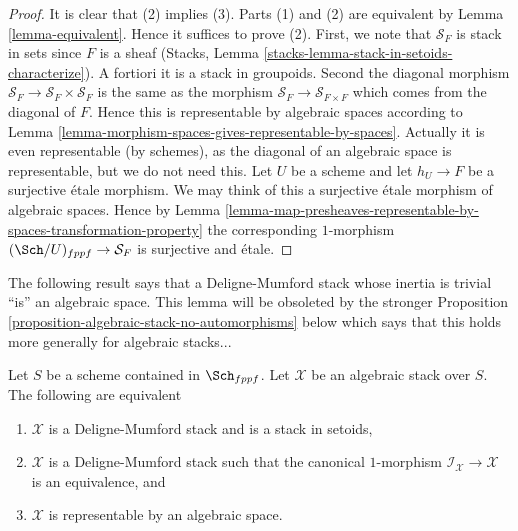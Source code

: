 \begin{proof}
It is clear that (2) implies (3).
Parts (1) and (2) are equivalent by Lemma \ref{lemma-equivalent}.
Hence it suffices to prove (2).
First, we note that $\mathcal{S}_F$ is stack in sets since
$F$ is a sheaf (Stacks, Lemma
\ref{stacks-lemma-stack-in-setoids-characterize}).
A fortiori it is a stack in groupoids. Second the diagonal
morphism $\mathcal{S}_F \to \mathcal{S}_F  \times \mathcal{S}_F$
is the same as the morphism $\mathcal{S}_F \to \mathcal{S}_{F \times F}$
which comes from the diagonal of $F$. Hence this is representable
by algebraic spaces according to
Lemma \ref{lemma-morphism-spaces-gives-representable-by-spaces}.
Actually it is even representable (by schemes), as the diagonal of
an algebraic space is representable, but we do not need this.
Let $U$ be a scheme and let $h_U \to F$ be a surjective \'etale morphism.
We may think of this a surjective \'etale morphism of algebraic spaces.
Hence by
Lemma
\ref{lemma-map-presheaves-representable-by-spaces-transformation-property}
the corresponding $1$-morphism $(\Sch/U)_{fppf} \to \mathcal{S}_F$
is surjective and \'etale.
\end{proof}

\noindent
The following result says that a Deligne-Mumford stack whose inertia
is trivial ``is'' an algebraic space. This lemma will be obsoleted by
the stronger
Proposition \ref{proposition-algebraic-stack-no-automorphisms}
below which says that this holds more generally for algebraic stacks...

\begin{lemma}
\label{lemma-algebraic-stack-no-automorphisms}
Let $S$ be a scheme contained in $\Sch_{fppf}$.
Let $\mathcal{X}$ be an algebraic stack over $S$.
The following are equivalent
\begin{enumerate}
\item $\mathcal{X}$ is a Deligne-Mumford stack and is a stack in setoids,
\item $\mathcal{X}$ is a Deligne-Mumford stack such that the
canonical $1$-morphism $\mathcal{I}_\mathcal{X} \to \mathcal{X}$
is an equivalence, and
\item $\mathcal{X}$ is representable by an algebraic space.
\end{enumerate}
\end{lemma}

